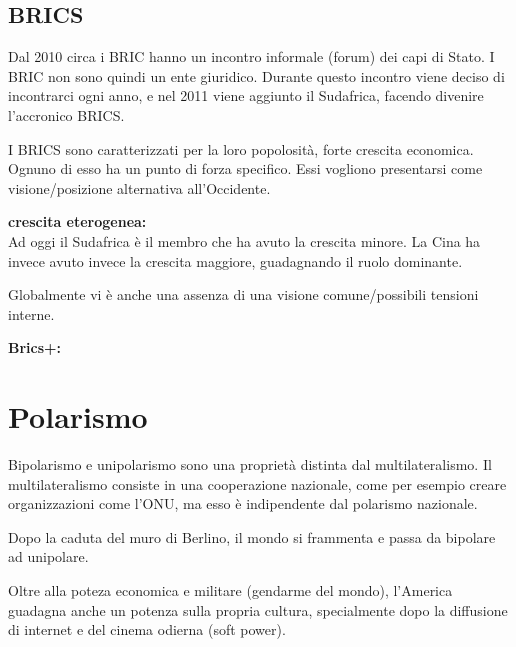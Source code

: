 \documentclass[a4paper]{article}
\begin{document}
\subsection{BRICS}


Dal 2010 circa i BRIC hanno un incontro informale (forum) dei capi di Stato.
I BRIC non sono quindi un ente giuridico.
Durante questo incontro viene deciso di incontrarci ogni anno, e nel 2011 viene aggiunto il Sudafrica,
facendo divenire l'accronico BRICS.

I BRICS sono caratterizzati per la loro popolosità, forte crescita economica.
Ognuno di esso ha un punto di forza specifico.
Essi vogliono presentarsi come visione/posizione alternativa all'Occidente.

\textbf{crescita eterogenea:} \\
Ad oggi il Sudafrica è il membro che ha avuto la crescita minore.
La Cina ha invece avuto invece la crescita maggiore, guadagnando il ruolo dominante.

Globalmente vi è anche una assenza di una visione comune/possibili tensioni interne.

\textbf{Brics+:} \\

\section{Polarismo}


Bipolarismo e unipolarismo sono una proprietà distinta dal multilateralismo.
Il multilateralismo consiste in una cooperazione nazionale, come per esempio creare organizzazioni
come l'ONU, ma esso è indipendente dal polarismo nazionale.

Dopo la caduta del muro di Berlino, il mondo si frammenta e passa da bipolare ad unipolare.

Oltre alla poteza economica e militare (gendarme del mondo), l'America
guadagna anche un potenza sulla propria cultura, specialmente dopo la diffusione di internet
e del cinema odierna (soft power).
\end{document}
